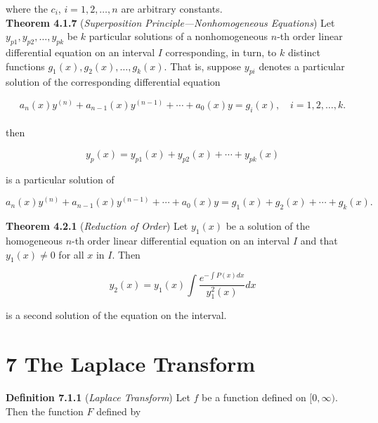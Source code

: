 \documentclass[12pt]{article}
\begin{document}
\noindent where the \(c_i\), \(i = 1, 2, \ldots, n\) are arbitrary constants.\\

\noindent\textbf{Theorem 4.1.7} (\emph{Superposition Principle—Nonhomogeneous Equations}) Let \(y_{p1}, y_{p2}, \ldots, y_{pk}\) be \(k\) particular solutions of a nonhomogeneous \(n\)-th order linear differential equation on an interval \(I\) corresponding, in turn, to \(k\) distinct functions \(g_1(x), g_2(x), \ldots, g_k(x)\). That is, suppose \(y_{pi}\) denotes a particular solution of the corresponding differential equation

\begin{equation}
    a_n(x)y^{(n)} + a_{n-1}(x)y^{(n-1)} + \cdots + a_0(x)y = g_i(x), \quad i = 1, 2, \ldots, k.
\end{equation}\\

\noindent then

\begin{equation}
    y_p(x) = y_{p1}(x) + y_{p2}(x) + \cdots + y_{pk}(x)
\end{equation}

\noindent is a particular solution of

\begin{equation}
    a_n(x)y^{(n)} + a_{n-1}(x)y^{(n-1)} + \cdots + a_0(x)y = g_1(x) + g_2(x) + \cdots + g_k(x).
\end{equation}

\noindent\textbf{Theorem 4.2.1} (\emph{Reduction of Order}) Let \(y_1(x)\) be a solution of the homogeneous \(n\)-th order linear differential equation on an interval \(I\) and that \(y_1(x) \neq 0\) for all \(x\) in \(I\). Then

\begin{equation}
    y_2(x) = y_1(x) \int \frac{e^{-\int P(x)dx}}{y_1^2(x)}dx
\end{equation}

\noindent is a second solution of the equation on the interval.\\

\newpage

\section*{7 The Laplace Transform}

\noindent\textbf{Definition 7.1.1} (\emph{Laplace Transform}) Let \(f\) be a function defined on \([0,\infty)\). Then the function \(F\) defined by
\end{document}
